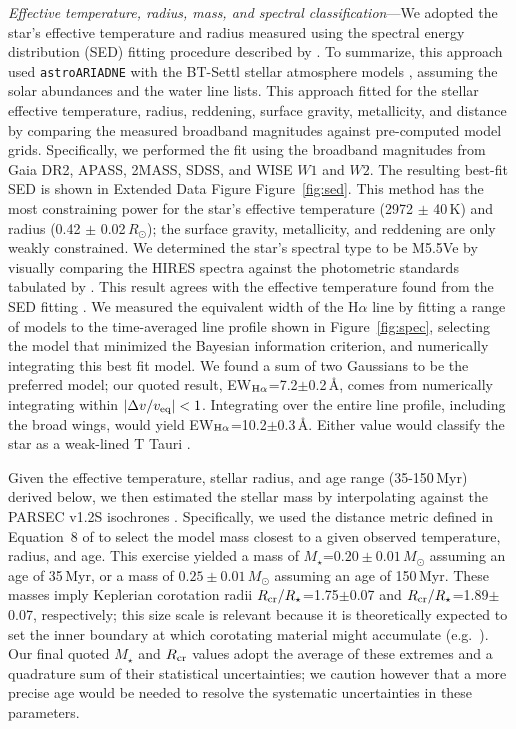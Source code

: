 \documentclass{nature3}
\begin{document}
\begin{methods}
{\it Effective temperature, radius, mass, and spectral
classification}---We adopted the star's effective temperature and
radius measured using the spectral energy distribution (SED) fitting
procedure described by \cite{Bouma2024}.  To summarize, this approach
used \texttt{astroARIADNE} \cite{Vines2022} with the BT-Settl stellar
atmosphere models \cite{Allard2012}, assuming the \cite{Asplund2009}
solar abundances and the \cite{Barber2006} water line lists.  This
approach fitted for the stellar effective temperature, radius,
reddening, surface gravity, metallicity, and distance by comparing the
measured broadband magnitudes against pre-computed model grids.
Specifically, we performed the fit using the broadband magnitudes from
Gaia DR2, APASS, 2MASS, SDSS, and WISE $W1$ and $W2$.  The resulting
best-fit SED is shown in Extended Data Figure Figure~\ref{fig:sed}.
This method has the most constraining power for the star's effective
temperature (2972 $\pm$ 40\,K) and radius (0.42 $\pm$
0.02\,$R_\odot$); the surface gravity, metallicity, and reddening are
only weakly constrained.  We determined the star's spectral type to be
M5.5Ve by visually comparing the HIRES spectra against the photometric
standards tabulated by \cite{Bochanski2007}.   This result agrees with
the effective temperature found from the SED fitting
\cite{Pecaut2013}.  We measured the equivalent width of the H$\alpha$
line by fitting a range of models to the time-averaged line profile
shown in Figure~\ref{fig:spec}, selecting the model that minimized the
Bayesian information criterion, and numerically integrating this best
fit model.  We found a sum of two Gaussians to be the preferred model;
our quoted result, EW$_{{\rm H}\alpha}$=7.2$\pm$0.2\,\AA, comes from
numerically integrating within $|\Delta v/v_{\rm eq}|<1$.  Integrating
over the entire line profile, including the broad wings, would yield
EW$_{{\rm H}\alpha}$=10.2$\pm$0.3\,\AA. Either value would classify
the star as a weak-lined T Tauri \cite{Briceno2019}.

Given the effective temperature, stellar radius, and age range
(35-150\,Myr) derived below, we then estimated the stellar mass by
interpolating against the PARSEC v1.2S isochrones \cite{Chen2014}.
Specifically, we used the distance metric defined in Equation~8 of
\cite{Bouma2024} to select the model mass closest to a given observed
temperature, radius, and age.  This exercise yielded a mass of
$M_\star$=$0.20\pm0.01$\,$M_\odot$ assuming an age of 35\,Myr, or a
mass of $0.25\pm0.01$\,$M_\odot$ assuming an age of 150\,Myr.  These
masses imply Keplerian corotation radii $R_{\rm
cr}/R_\star$=1.75$\pm$0.07 and $R_{\rm cr}/R_\star$=1.89$\pm$0.07,
respectively; this size scale is relevant because it is theoretically
expected to set the inner boundary at which corotating material might
accumulate (e.g.~\cite{Townsend2005,Daley-Yates2024}).  Our final
quoted $M_\star$ and $R_{\rm cr}$ values adopt the average of these
extremes and a quadrature sum of their statistical uncertainties; we
caution however that a more precise age would be needed to resolve the
systematic uncertainties in these parameters.



\end{methods}
\end{document}
